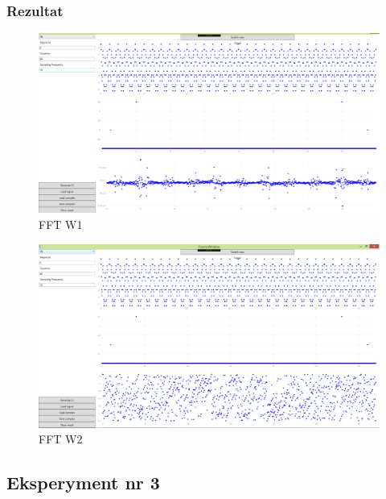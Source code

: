 \documentclass[12pt]{article}
\begin{document}
\subsubsection{Rezultat}
\begin{figure}[H]
 \centering
 \includegraphics[width=14cm]{images/fftw1.PNG}
 \vspace{-0.3cm}
 \caption{FFT W1}
 \label{gui}
\end{figure}
\begin{figure}[H]
 \centering
 \includegraphics[width=14cm]{images/fftw2.PNG}
 \vspace{-0.3cm}
 \caption{FFT W2}
 \label{gui}
\end{figure}






\subsection{Eksperyment nr 3 }
\end{document}
